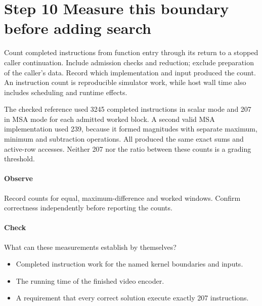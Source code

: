 \section{Step 10 Measure this boundary before adding search}\label{h263-sad-s10}
Count completed instructions from function entry through its return to a stopped
caller continuation. Include admission checks and reduction; exclude preparation
of the caller's data. Record which implementation and input produced the count.
An instruction count is reproducible simulator work, while host wall time also
includes scheduling and runtime effects.

The checked reference used 3245 completed instructions in scalar mode and 207 in
MSA mode for each admitted worked block. A second valid MSA implementation used
239, because it formed magnitudes with separate maximum, minimum and subtraction
operations. All produced the same exact sums and active-row accesses. Neither
207 nor the ratio between these counts is a grading threshold.

\paragraph{Observe} Record counts for equal, maximum-difference and worked
windows. Confirm correctness independently before reporting the counts.
\paragraph{Check} What can these measurements establish by themselves?
\begin{itemize}
  \item[A.] Completed instruction work for the named kernel boundaries and inputs.
  \item[B.] The running time of the finished video encoder.
  \item[C.] A requirement that every correct solution execute exactly 207 instructions.
\end{itemize}
